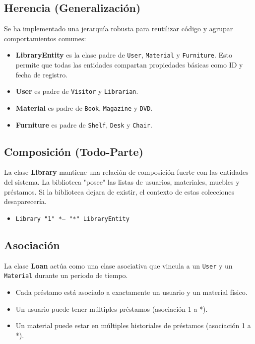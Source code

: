 \documentclass[stu, 12pt, letterpaper, donotrepeattitle]{apa7}
\begin{document}
    \subsection{Herencia (Generalización)}
    Se ha implementado una jerarquía robusta para reutilizar código y agrupar comportamientos comunes:
    \begin{itemize}
        \item \textbf{LibraryEntity} es la clase padre de \texttt{User}, \texttt{Material} y \texttt{Furniture}. Esto permite que todas las entidades compartan propiedades básicas como ID y fecha de registro.
        \item \textbf{User} es padre de \texttt{Visitor} y \texttt{Librarian}.
        \item \textbf{Material} es padre de \texttt{Book}, \texttt{Magazine} y \texttt{DVD}.
        \item \textbf{Furniture} es padre de \texttt{Shelf}, \texttt{Desk} y \texttt{Chair}.
    \end{itemize}

    \subsection{Composición (Todo-Parte)}
    La clase \textbf{Library} mantiene una relación de composición fuerte con las entidades del sistema. La biblioteca "posee" las listas de usuarios, materiales, muebles y préstamos. Si la biblioteca dejara de existir, el contexto de estas colecciones desaparecería.
    \begin{itemize}
        \item \texttt{Library "1" *-- "*" LibraryEntity}
    \end{itemize}

    \subsection{Asociación}
    La clase \textbf{Loan} actúa como una clase asociativa que vincula a un \texttt{User} y un \texttt{Material} durante un periodo de tiempo.
    \begin{itemize}
        \item Cada préstamo está asociado a exactamente un usuario y un material físico.
        \item Un usuario puede tener múltiples préstamos (asociación 1 a *).
        \item Un material puede estar en múltiples historiales de préstamos (asociación 1 a *).
    \end{itemize}
\end{document}
